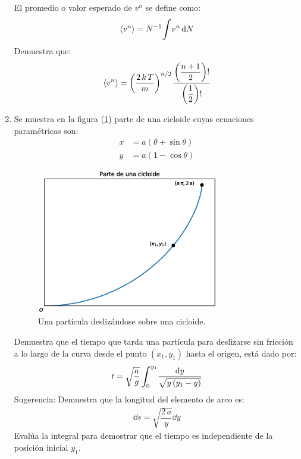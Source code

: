 \documentclass[12pt]{article}
\def\scaleint#1{\vcenter{\hbox{\scaleto[3ex]{\displaystyle\int}{#1}}}}
\def\bs{\mkern-12mu}
\begin{document}
\begin{enumerate}
El promedio o valor esperado de $v^{n}$ se define como:
\begin{align*}
\expval{v^{n}} = N^{-1} \scaleint{6ex} v^{n} \dd{N}
\end{align*}
Demuestra que:
\begin{align*}
\expval{v^{n}} = \left( \dfrac{2 \, k \, T}{m} \right)^{n/2} \dfrac{\left( \dfrac{n + 1}{2} \right) !} { \left( \dfrac{1}{2} \right) !}
\end{align*}
\item Se muestra en la figura (\ref{fig:figura_cicloide}) parte de una cicloide cuyas ecuaciones paramétricas son:
\begin{align*}
x &= a (\theta + \sin \theta) \\[0.5em]
y &= a (1 - \cos \theta)
\end{align*}
\begin{figure}[H]
    \centering
    \includegraphics[width=0.75\textwidth]{Imagenes/plot_cicloide.eps}
    \caption{Una partícula deslizándose sobre una cicloide.}
    \label{fig:figura_cicloide}
\end{figure}
Demuestra que el tiempo que tarda una partícula para deslizarse sin fricción a lo largo de la curva desde el punto $(x_{1}, y_{1})$ hasta el origen, está dado por:
\begin{align*}
t = \sqrt{\dfrac{a}{g}} \, \scaleint{6ex}_{\bs 0}^{y_{1}} \dfrac{\dd{y}}{\sqrt{y \, (y_{1}- y)}}
\end{align*}
Sugerencia: Demuestra que la longitud del elemento de arco es:
\begin{align*}
\dd{s} = \sqrt{\dfrac{2 \, a}{y}} \dd{y}
\end{align*}
Evalúa la integral para demostrar que el tiempo es independiente de la posición inicial $y_{1}$.
\end{enumerate}
\end{document}
